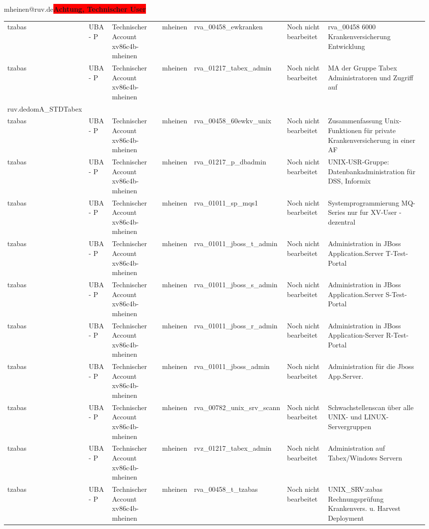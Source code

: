 \documentclass[a4paper,landscape,12pt]{letter}
\begin{document}
\begin{letter}{mheinen@ruv.de\space\space\space\space\space\space\space\space\space\bfseries\colorbox{red}{Achtung, Technischer User}\hfill \break}
\begin{tiny}
\begin{longtable}{|p{35mm}|p{15mm}|p{25mm}|p{10mm}|p{40mm}|p{50mm}|p{50mm}|}
tzabas & UBA - P & Technischer Account xv86c4b-mheinen & mheinen & rva\_00458\_ewkranken & Noch nicht bearbeitet & rva\_00458 6000 Krankenversicherung Entwicklung \\
tzabas & UBA - P & Technischer Account xv86c4b-mheinen & mheinen & rva\_01217\_tabex\_admin & Noch nicht bearbeitet & MA der Gruppe Tabex Administratoren und Zugriff auf \\ruv.dedomA\_STDTabex \\
tzabas & UBA - P & Technischer Account xv86c4b-mheinen & mheinen & rva\_00458\_60ewkv\_unix & Noch nicht bearbeitet & Zusammenfassung Unix-Funktionen für private Krankenversicherung in einer AF \\
tzabas & UBA - P & Technischer Account xv86c4b-mheinen & mheinen & rva\_01217\_p\_dbadmin & Noch nicht bearbeitet & UNIX-USR-Gruppe: Datenbankadministration für  DSS, Informix \\
tzabas & UBA - P & Technischer Account xv86c4b-mheinen & mheinen & rva\_01011\_sp\_mqs1 & Noch nicht bearbeitet & Systemprogrammierung MQ-Series nur fur XV-User - dezentral \\
tzabas & UBA - P & Technischer Account xv86c4b-mheinen & mheinen & rva\_01011\_jboss\_t\_admin & Noch nicht bearbeitet & Administration in JBoss Application.Server T-Test-Portal \\
tzabas & UBA - P & Technischer Account xv86c4b-mheinen & mheinen & rva\_01011\_jboss\_s\_admin & Noch nicht bearbeitet & Administration in JBoss Application.Server S-Test-Portal \\
tzabas & UBA - P & Technischer Account xv86c4b-mheinen & mheinen & rva\_01011\_jboss\_r\_admin & Noch nicht bearbeitet & Administration in JBoss Application-Server R-Test-Portal \\
tzabas & UBA - P & Technischer Account xv86c4b-mheinen & mheinen & rva\_01011\_jboss\_admin & Noch nicht bearbeitet & Administration für die Jboss App.Server. \\
tzabas & UBA - P & Technischer Account xv86c4b-mheinen & mheinen & rva\_00782\_unix\_srv\_scann & Noch nicht bearbeitet & Schwachstellenscan über alle UNIX- und LINUX-Servergruppen \\
tzabas & UBA - P & Technischer Account xv86c4b-mheinen & mheinen & rvz\_01217\_tabex\_admin & Noch nicht bearbeitet & Administration auf Tabex/Windows Servern \\
tzabas & UBA - P & Technischer Account xv86c4b-mheinen & mheinen & rva\_00458\_t\_tzabas & Noch nicht bearbeitet & UNIX\_SRV:zabas Rechnungsprüfung Krankenvers. u. Harvest Deployment \\

\end{longtable}
\end{tiny}
\end{letter}
\end{document}
